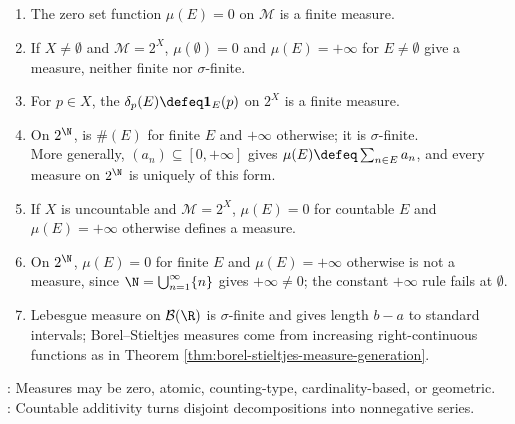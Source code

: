 \begin{example} \label{ex:first-abstract-measures} 
\begin{enumerate}[label=(\roman*)]
\setlength{\itemsep}{0pt}
\item The zero set function $\mu(E)=0$ on $\mathcal{M}$ is a finite measure.
\item If $X\neq\emptyset$ and $\mathcal{M}=2^X$, $\mu(\emptyset)=0$ and $\mu(E)=+\infty$ for $E\neq\emptyset$ give a measure, neither finite nor $\sigma$-finite.
\item For $p\in X$, the  $\delta_p(E)\defeq\mathbf{1}_E(p)$ on $2^X$ is a finite measure.
\item On $2^\N$,  is $\#(E)$ for finite $E$ and $+\infty$ otherwise; it is $\sigma$-finite.\\
More generally, $(a_n)\subseteq[0,+\infty]$ gives $\mu(E)\defeq\sum_{n\in E}a_n$, and every measure on $2^\N$ is uniquely of this form.
\item If $X$ is uncountable and $\mathcal{M}=2^X$, $\mu(E)=0$ for countable $E$ and $\mu(E)=+\infty$ otherwise defines a measure.
\item On $2^\N$, $\mu(E)=0$ for finite $E$ and $\mu(E)=+\infty$ otherwise is not a measure, since $\N=\bigcup_{n=1}^{\infty}\{n\}$ gives $+\infty\neq0$; the constant $+\infty$ rule fails at $\emptyset$.
\item Lebesgue measure on $\mathcal{B}(\R)$ is $\sigma$-finite and gives length $b-a$ to standard intervals; Borel--Stieltjes measures come from increasing right-continuous functions as in Theorem \ref{thm:borel-stieltjes-measure-generation}.
\end{enumerate}
: Measures may be zero, atomic, counting-type, cardinality-based, or geometric.\\
: Countable additivity turns disjoint decompositions into nonnegative series.
\end{example}

